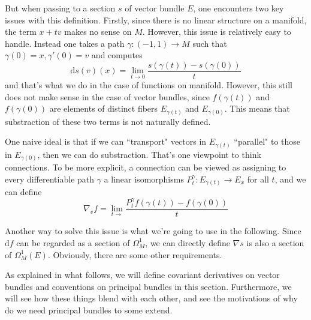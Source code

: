 \documentclass[11pt]{amsart}
\numberwithin{equation}{section}
\theoremstyle{plain}
\theoremstyle{plain}
\numberwithin{equation}{section}
\begin{document}
But when passing to a section $s$ of vector bundle $E$, one encounters two key issues with this definition. Firstly, since there is no linear structure on a manifold, the term $x+tv$ makes no sense on $M$. However, this issue is relatively easy to handle. Instead one takes a path $\gamma:(-1,1)\to M$ such that $\gamma(0)=x,\gamma'(0)=v$ and computes
$$
\mathrm{d}s(v)(x)=\lim_{t\to0}\frac{s(\gamma(t))-s(\gamma(0))}{t}
$$
and that's what we do in the case of functions on manifold. However, this still does not make sense in the case of vector bundles, since $f(\gamma(t))$ and $f(\gamma(0))$ are elements of distinct fibers $E_{\gamma(t)}$ and $E_{\gamma(0)}$. This means that substraction of these two terms is not naturally defined.

One naive ideal is that if we can “transport" vectors in $E_{\gamma(t)}$ “parallel" to those in $E_{\gamma(0)}$, then we can do substraction. That's one viewpoint to think connections. To be more explicit, a connection can be viewed as assigning to every differentiable path $\gamma$ a linear isomorphisms $P_t^{\gamma}:E_{\gamma(t)}\to E_x$ for all $t$, and we can define
$$
\nabla_vf=\lim_{t\to}\frac{P^{\gamma}_tf(\gamma(t))-f(\gamma(0))}{t}
$$

Another way to solve this issue is what we're going to use in the following. Since $\mathrm{d}f$ can be regarded as a section of $\Omega_M^1$, we can directly define $\nabla s$ is also a section of $\Omega_M^1(E)$. Obviously, there are some other requirements.

As explained in what follows, we will define covariant derivatives on vector bundles and conventions on principal bundles in this section. Furthermore, we will see how these things blend with each other, and see the motivations of why do we need principal bundles to some extend.
\end{document}
